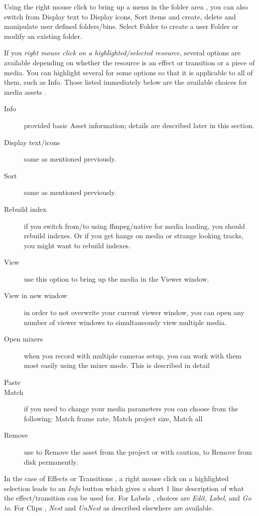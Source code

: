 Using the right mouse click to bring up a menu in the folder area , you can also switch from Display text to Display icons, Sort items and create, delete and manipulate user defined folders/bins. Select Folder to create a user Folder or modify an existing folder.

If you \textit{right mouse click on a highlighted/selected resource}, several options are available depending on whether the resource is an effect or transition or a piece of media.  
You can highlight several for some options so that it is applicable to all of them, such as Info.  
Those listed immediately below are the available choices for media assets .


\begin{description}
    \item[Info] provided basic Asset information; details are described later in this section.
    \item[Display text/icons]  same as mentioned previously.
    \item[Sort]  same as mentioned previously.
    \item[Rebuild index]  if you switch from/to using ffmpeg/native for media loading, you should rebuild
        indexes.  Or if you get hangs on media or strange looking tracks, you might want to rebuild indexes.
    \item[View]  use this option to bring up the media in the Viewer window.
    \item[View in new window]  in order to not overwrite your current viewer window, you can open any
        number of viewer windows to simultaneously view multiple media.
    \item[Open mixers]  when you record with multiple cameras setup, you can work with them most easily
        using the mixer mode.  This is described in detail
    \item[Paste]  
    \item[Match]  if you need to change your media parameters you can choose from the following: Match frame
        rate, Match project size, Match all 
    \item[Remove]  use to Remove the asset from the project or with caution, to Remove from disk permanently.
\end{description}

In the case of Effects or Transitions , a right mouse click on a highlighted selection leads to an \emph{Info} button which gives a short 1 line description of what the effect/transition can be used for.
For Labels , choices are \emph{Edit}, \emph{Label}, and \emph{Go to}.
For Clips , \emph{Nest} and \emph{UnNest} as described elsewhere are available.

